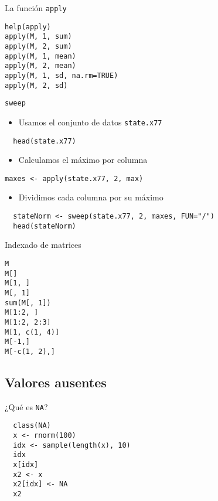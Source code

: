 \documentclass[xcolor={usenames,svgnames,dvipsnames}]{beamer}
\begin{document}
\begin{frame}[fragile,label=sec-2-2-6]{La función \texttt{apply}}
 \lstset{language=R,label= ,caption= ,numbers=none}
\begin{lstlisting}
help(apply)
apply(M, 1, sum)
apply(M, 2, sum)
apply(M, 1, mean)
apply(M, 2, mean)
apply(M, 1, sd, na.rm=TRUE)
apply(M, 2, sd)
\end{lstlisting}
\end{frame}

\begin{frame}[fragile,label=sec-2-2-7]{\texttt{sweep}}
 \begin{itemize}
\item Usamos el conjunto de datos \texttt{state.x77}
\end{itemize}
\lstset{language=R,label= ,caption= ,numbers=none}
\begin{lstlisting}
  head(state.x77)
\end{lstlisting}
\begin{itemize}
\item Calculamos el máximo por columna
\end{itemize}
\lstset{language=R,label= ,caption= ,numbers=none}
\begin{lstlisting}
maxes <- apply(state.x77, 2, max)
\end{lstlisting}
\begin{itemize}
\item Dividimos cada columna por su máximo
\end{itemize}
\lstset{language=R,label= ,caption= ,numbers=none}
\begin{lstlisting}
  stateNorm <- sweep(state.x77, 2, maxes, FUN="/")
  head(stateNorm)
\end{lstlisting}
\end{frame}

\begin{frame}[fragile,label=sec-2-2-8]{Indexado de matrices}
 \lstset{language=R,label= ,caption= ,numbers=none}
\begin{lstlisting}
M
M[]
M[1, ]
M[, 1]
sum(M[, 1])
M[1:2, ]
M[1:2, 2:3]
M[1, c(1, 4)]
M[-1,]
M[-c(1, 2),]
\end{lstlisting}
\end{frame}


\subsection{Valores ausentes}
\label{sec-2-3}

\begin{frame}[fragile,label=sec-2-3-1]{¿Qué es \texttt{NA}?}
 \lstset{language=R,label= ,caption= ,numbers=none}
\begin{lstlisting}
  class(NA)
  x <- rnorm(100)
  idx <- sample(length(x), 10)
  idx
  x[idx]
  x2 <- x
  x2[idx] <- NA
  x2
\end{lstlisting}
\end{frame}
\end{document}
